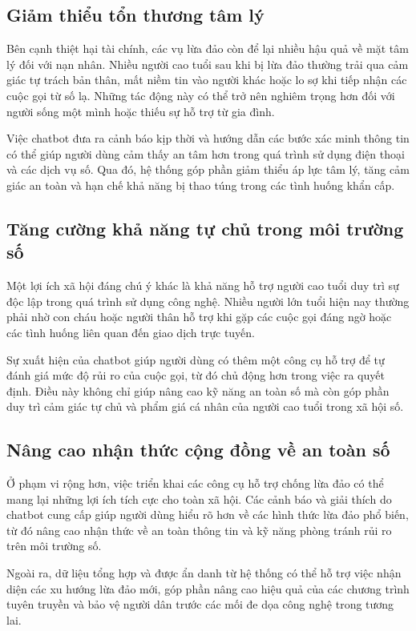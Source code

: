 \subsection{Giảm thiểu tổn thương tâm lý}
Bên cạnh thiệt hại tài chính, các vụ lừa đảo còn để lại nhiều hậu quả về mặt tâm lý đối với nạn nhân. Nhiều người cao tuổi sau khi bị lừa đảo thường trải qua cảm giác tự trách bản thân, mất niềm tin vào người khác hoặc lo sợ khi tiếp nhận các cuộc gọi từ số lạ. Những tác động này có thể trở nên nghiêm trọng hơn đối với người sống một mình hoặc thiếu sự hỗ trợ từ gia đình.

Việc chatbot đưa ra cảnh báo kịp thời và hướng dẫn các bước xác minh thông tin có thể giúp người dùng cảm thấy an tâm hơn trong quá trình sử dụng điện thoại và các dịch vụ số. Qua đó, hệ thống góp phần giảm thiểu áp lực tâm lý, tăng cảm giác an toàn và hạn chế khả năng bị thao túng trong các tình huống khẩn cấp.

\subsection{Tăng cường khả năng tự chủ trong môi trường số}
Một lợi ích xã hội đáng chú ý khác là khả năng hỗ trợ người cao tuổi duy trì sự độc lập trong quá trình sử dụng công nghệ. Nhiều người lớn tuổi hiện nay thường phải nhờ con cháu hoặc người thân hỗ trợ khi gặp các cuộc gọi đáng ngờ hoặc các tình huống liên quan đến giao dịch trực tuyến.

Sự xuất hiện của chatbot giúp người dùng có thêm một công cụ hỗ trợ để tự đánh giá mức độ rủi ro của cuộc gọi, từ đó chủ động hơn trong việc ra quyết định. Điều này không chỉ giúp nâng cao kỹ năng an toàn số mà còn góp phần duy trì cảm giác tự chủ và phẩm giá cá nhân của người cao tuổi trong xã hội số.

\subsection{Nâng cao nhận thức cộng đồng về an toàn số}
Ở phạm vi rộng hơn, việc triển khai các công cụ hỗ trợ chống lừa đảo có thể mang lại những lợi ích tích cực cho toàn xã hội. Các cảnh báo và giải thích do chatbot cung cấp giúp người dùng hiểu rõ hơn về các hình thức lừa đảo phổ biến, từ đó nâng cao nhận thức về an toàn thông tin và kỹ năng phòng tránh rủi ro trên môi trường số.

Ngoài ra, dữ liệu tổng hợp và được ẩn danh từ hệ thống có thể hỗ trợ việc nhận diện các xu hướng lừa đảo mới, góp phần nâng cao hiệu quả của các chương trình tuyên truyền và bảo vệ người dân trước các mối đe dọa công nghệ trong tương lai.

